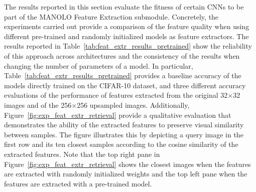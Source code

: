 The results reported in this section evaluate the fitness of certain CNNs to be part of the MANOLO Feature Extraction submodule. Concretely, the experiments carried out provide a comparison of the feature quality when using different pre-trained and randomly initialized models as feature extractors. The results reported in Table~\ref{tab:feat_extr_results_pretrained} show the reliability of this approach across architectures and the consistency of the results when changing the number of parameters of a model. In particular, Table~\ref{tab:feat_extr_results_pretrained} provides a baseline accuracy of the models directly trained on the CIFAR-10 dataset, and three different accuracy evaluations of the performance of features extracted from the original 32$\times$32 images and of the 256$\times$256 upsampled images. Additionally, Figure~\ref{fig:exp_feat_extr_retrieval} provide a qualitative evaluation that demonstrates the ability of the extracted features to preserve visual similarity between samples. The figure illustrates this by depicting a query image in the first row and its ten closest samples according to the cosine similarity of the extracted features. Note that the top right pane in Figure~\ref{fig:exp_feat_extr_retrieval} shows the closest images when the features are extracted with randomly initialized weights and the top left pane when the features are extracted with a pre-trained model.


